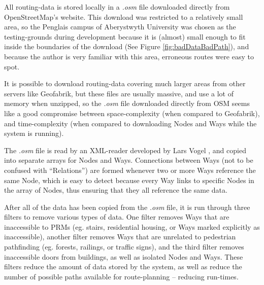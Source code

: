 All routing-data is stored locally in a \textit{.osm} file downloaded directly from OpenStreetMap's website\cite{OSM}. This download was restricted to a relatively small area, so the Penglais campus of Aberystwyth University was chosen as the testing-grounds during development because it is (almost) small enough to fit inside the boundaries of the download (See Figure \ref{fig:badDataBadPath}), and because the author is very familiar with this area, erroneous routes were easy to spot.

It is possible to download routing-data covering much larger areas from other servers like Geofabrik\cite{geofabrik}, but these files are usually massive, and use a lot of memory when unzipped, so the \textit{.osm} file downloaded directly from OSM seems like a good compromise between space-complexity (when compared to Geofabrik), and time-complexity (when compared to downloading Nodes and Ways while the system is running).

The \textit{.osm} file is read by an XML-reader developed by Lars Vogel \cite{Vogella-XML}, and copied into separate arrays for Nodes and Ways. Connections between Ways (not to be confused with \textquotedblleft Relations\textquotedblright\cite{OSM-Relation}) are formed whenever two or more Ways reference the same Node, which is easy to detect because every Way links to specific Nodes in the array of Nodes, thus ensuring that they all reference the same data.

After all of the data has been copied from the \textit{.osm} file, it is run through three filters to remove various types of data. One filter removes Ways that are inaccessible to PRMs (eg. stairs, residential housing, or Ways marked explicitly as inaccessible), another filter removes Ways that are unrelated to pedestrian pathfinding (eg. forests, railings, or traffic signs), and the third filter removes inaccessible doors from buildings, as well as isolated Nodes and Ways. These filters reduce the amount of data stored by the system, as well as reduce the number of possible paths available for route-planning -- reducing run-times.

